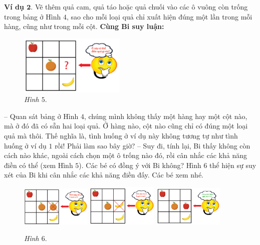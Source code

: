 	\textbf{Ví dụ $\pmb2.$} Vẽ thêm quả cam, quả táo hoặc quả chuối vào các ô vuông còn trống trong bảng ở Hình $4$, sao cho mỗi loại quả chỉ xuất hiện đúng một lần trong mỗi hàng, cũng như trong mỗi cột.
	\vskip 0.1cm
	\textbf{Cùng Bi suy luận:}
	\vskip 0.15cm
	\begin{figure}
		\centering
		\vspace*{-5pt}
		\captionsetup{labelformat= empty, justification=centering}
		\includegraphics[width=0.45\textwidth]{hinh5}
		\caption{\small\textit{Hình $5.$}}
		\vspace*{-5pt}
	\end{figure}
	-- Quan sát bảng ở Hình $4$, chúng mình không thấy một hàng hay một cột nào, mà ở đó đã có sẵn hai loại quả. Ở hàng nào, cột nào cũng chỉ có đúng một loại quả mà thôi. Thế nghĩa là,  tình huống ở ví dụ này không tương tự như tình huống ở ví dụ $1$ rồi! Phải làm sao bây giờ?
	\vskip 0.1cm	
	-- Suy đi, tính lại, Bi thấy không còn cách nào khác, ngoài cách chọn một ô trống nào đó, rồi cân nhắc các khả năng điền có thể (xem Hình $5$). Các bé có đồng ý với Bi không?
	\vskip 0.1cm
	Hình $6$ thể hiện sự suy xét của Bi khi cân nhắc các khả năng điền đấy. Các bé xem nhé.
	\begin{figure}[H]
		\centering
		\vspace*{-5pt}
		\captionsetup{labelformat= empty, justification=centering}
		\includegraphics[width=0.3\textwidth]{hinh6a}\hfill
		\includegraphics[width=0.3\textwidth]{hinh6b}\hfill
		\includegraphics[width=0.3\textwidth]{hinh6c}
		\caption{\small\textit{Hình $6.$}}
		\vspace*{-10pt}
	\end{figure}

